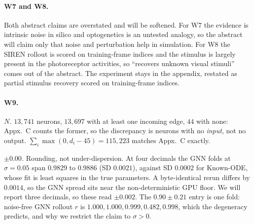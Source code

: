 \documentclass[11pt]{article}
\begin{document}
\paragraph{W7 and W8.}
Both abstract claims are overstated and will be softened. For W7 the evidence is
intrinsic noise in silico and optogenetics is an untested analogy, so the
abstract will claim only that noise and perturbation help in simulation. For W8
the SIREN rollout is scored on training-frame indices and the stimulus is largely
present in the photoreceptor activities, so ``recovers unknown visual stimuli''
comes out of the abstract. The experiment stays in the appendix, restated as
partial stimulus recovery scored on training-frame indices.

\paragraph{W9.}
\emph{$N$.} $13{,}741$ neurons, $13{,}697$ with at least one incoming edge, $44$
with none: Appx.~C counts the former, so the discrepancy is neurons with no
\emph{input}, not no output. $\sum_i \max(0, d_i - 45) = 115{,}223$ matches
Appx.~C exactly.

\emph{$\pm 0.00$.} Rounding, not under-dispersion. At four decimals the GNN folds
at $\sigma = 0.05$ span $0.9829$ to $0.9886$ (SD $0.0021$), against SD $0.0002$
for Known-ODE, whose fit is least squares in the true parameters. A
byte-identical rerun differs by $0.0014$, so the GNN spread sits near the
non-deterministic GPU floor. We will report three decimals, so these read
$\pm 0.002$. The $0.90 \pm 0.21$ entry is one fold: noise-free GNN rollout $r$ is
$1.000, 1.000, 0.999, 0.482, 0.998$, which the degeneracy predicts, and why we
restrict the claim to $\sigma > 0$.
\end{document}
